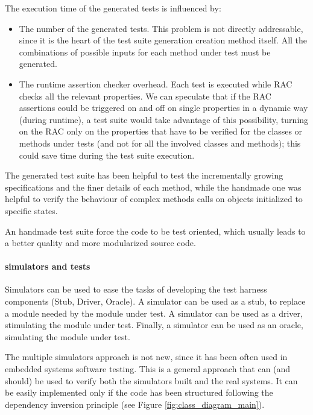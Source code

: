 \documentclass[english]{lni}
\begin{document}
The execution time of the generated tests is influenced by:
\begin{itemize}
\item The number of the generated tests. 
This problem is not directly addressable, since it is the heart of the test suite generation creation method itself. 
All the combinations of possible inputs for each method under test must be generated.
\item The runtime assertion checker overhead. 
Each test is executed while RAC checks all the relevant properties. 
We can speculate that if the RAC assertions could be triggered on and off on single properties in a dynamic way (during runtime), a test suite would take advantage of this possibility, turning on the RAC only on the properties that have to be verified for the classes or methods under tests (and not for all the involved classes and methods); this could save time during the test suite execution.
\end{itemize}

The generated test suite has been helpful to test the incrementally growing specifications and the finer details of each method, while the handmade one was helpful to verify the behaviour of complex methods calls on objects initialized to specific states. 

An handmade test suite force the code to be test oriented, which usually leads to a better quality and more modularized source code\cite{Binder1999}.

\paragraph*{simulators and tests}

Simulators can be used to ease the tasks of developing the test harness components (Stub, Driver, Oracle).
A simulator can be used as a stub, to replace a module needed by the module under test.
A simulator can be used as a driver, stimulating the module under test.
Finally, a simulator can be used as an oracle, simulating the module under test.

The multiple simulators approach is not new, since it has been often used in embedded systems software testing\cite{Broekman2002}.  
This is a general approach that can (and should) be used to verify both the simulators built and the real systems.  
It can be easily implemented only if the code has been structured following the dependency inversion principle\cite{Martin1996} (see Figure
\ref{fig:class_diagram_main}).
\end{document}
